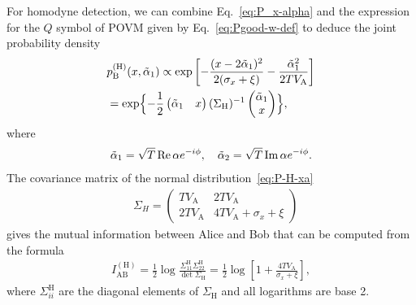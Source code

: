 \documentclass[%
reprint,
superscriptaddress,
 amsmath,amssymb,amsfonts,
 aps,
 pra,
 longbibliography
]{revtex4-2}
\renewcommand{\Re}{\mathop{\rm Re}\nolimits}
\renewcommand{\Im}{\mathop{\rm Im}\nolimits}
\newcommand{\ind}[1]{\mathrm{#1}}
\begin{document}
For homodyne detection,
we can combine Eq.~\eqref{eq:P_x-alpha}
and the expression for the $Q$ symbol
of POVM given by Eq.~\eqref{eq:Pgood-w-def}
to deduce the joint probability density 
\begin{align}
  &
\label{eq:P-H-xa}
   p_{\ind{B}}^{(\ind{H})}(x,\tilde\alpha_1) 
  \propto
    \exp\left[
    -\frac{(x-2\tilde\alpha_1)^2}{2(\sigma_x+\xi)}-\frac{\tilde\alpha_1^2}{2TV_{\ind{A}}}
  \right]
  \notag
  \\
  &
  =\exp\Bigl\{
  -\frac{1}{2}
    \begin{pmatrix}
        \tilde\alpha_1&x
    \end{pmatrix} (\Sigma_{\ind{H}})^{-1}
    \begin{pmatrix}
        \tilde\alpha_1\\x
    \end{pmatrix}
  \Bigr\},
\end{align}
where
\begin{align}
  \label{eq:talpha}
  \tilde{\alpha}_1=\sqrt{T}\Re\alpha e^{-i\phi},\quad
  \tilde{\alpha}_2=\sqrt{T}\Im\alpha e^{-i\phi}.
\end{align}
The covariance matrix of the normal distribution~\eqref{eq:P-H-xa}
\begin{align}
    \label{eq:sigma-hom-def}
  &
    \Sigma_H=
    \begin{pmatrix}
        {TV_{\ind{A}}}&2{TV_{\ind{A}}}\\
        2{TV_{\ind{A}}}&4TV_{\ind{A}}+\sigma_x+\xi
    \end{pmatrix}
\end{align}
gives  the mutual information
between Alice and Bob that can be computed
from the formula~\cite{SochEtAl2024_StatProofBook}
\begin{align}
\label{eq:IABPM}
    I_{\ind{AB}}^{(\ind{H})}=\frac{1}{2}\log \frac{\Sigma^{\ind{H}}_{11}\Sigma^{\ind{H}}_{22}}
    {\det\Sigma_{\ind{H}}}
    =\frac{1}{2}\log\left[1+\frac{4TV_{\ind{A}}}{\sigma_x+\xi}\right],
\end{align}
where $\Sigma^{\ind{H}}_{ii}$ are the diagonal elements of $\Sigma_{\ind{H}}$
and all logarithms are base 2.
\end{document}

